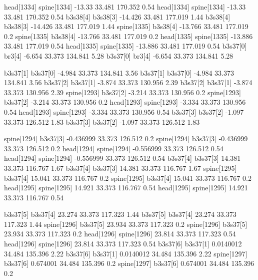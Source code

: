 head[1334]    spine[1334]    -13.33    33.481    170.352    0.54
head[1334]    spine[1334]    -13.33    33.481    170.352    0.54
b3s38[4]    b3s38[3]    -14.426    33.481    177.019    1.44
b3s38[4]    b3s38[3]    -14.426    33.481    177.019    1.44
spine[1335]    b3s38[4]    -13.766    33.481    177.019    0.2
spine[1335]    b3s38[4]    -13.766    33.481    177.019    0.2
head[1335]    spine[1335]    -13.886    33.481    177.019    0.54
head[1335]    spine[1335]    -13.886    33.481    177.019    0.54
b3s37[0]    br3[4]    -6.654    33.373    134.841    5.28
b3s37[0]    br3[4]    -6.654    33.373    134.841    5.28


b3s37[1]    b3s37[0]    -4.984    33.373    134.841    3.56
b3s37[1]    b3s37[0]    -4.984    33.373    134.841    3.56
b3s37[2]    b3s37[1]    -3.874    33.373    130.956    2.39
b3s37[2]    b3s37[1]    -3.874    33.373    130.956    2.39
spine[1293]    b3s37[2]    -3.214    33.373    130.956    0.2
spine[1293]    b3s37[2]    -3.214    33.373    130.956    0.2
head[1293]    spine[1293]    -3.334    33.373    130.956    0.54
head[1293]    spine[1293]    -3.334    33.373    130.956    0.54
b3s37[3]    b3s37[2]    -1.097    33.373    126.512    1.83
b3s37[3]    b3s37[2]    -1.097    33.373    126.512    1.83


spine[1294]    b3s37[3]    -0.436999    33.373    126.512    0.2
spine[1294]    b3s37[3]    -0.436999    33.373    126.512    0.2
head[1294]    spine[1294]    -0.556999    33.373    126.512    0.54
head[1294]    spine[1294]    -0.556999    33.373    126.512    0.54
b3s37[4]    b3s37[3]    14.381    33.373    116.767    1.67
b3s37[4]    b3s37[3]    14.381    33.373    116.767    1.67
spine[1295]    b3s37[4]    15.041    33.373    116.767    0.2
spine[1295]    b3s37[4]    15.041    33.373    116.767    0.2
head[1295]    spine[1295]    14.921    33.373    116.767    0.54
head[1295]    spine[1295]    14.921    33.373    116.767    0.54


b3s37[5]    b3s37[4]    23.274    33.373    117.323    1.44
b3s37[5]    b3s37[4]    23.274    33.373    117.323    1.44
spine[1296]    b3s37[5]    23.934    33.373    117.323    0.2
spine[1296]    b3s37[5]    23.934    33.373    117.323    0.2
head[1296]    spine[1296]    23.814    33.373    117.323    0.54
head[1296]    spine[1296]    23.814    33.373    117.323    0.54
b3s37[6]    b3s37[1]    0.0140012    34.484    135.396    2.22
b3s37[6]    b3s37[1]    0.0140012    34.484    135.396    2.22
spine[1297]    b3s37[6]    0.674001    34.484    135.396    0.2
spine[1297]    b3s37[6]    0.674001    34.484    135.396    0.2


